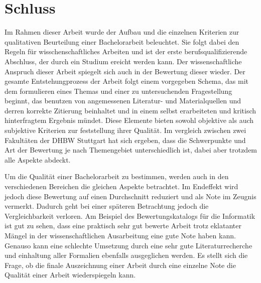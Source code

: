 
 
\chapter{Schluss}
Im Rahmen dieser Arbeit wurde der Aufbau und die einzelnen Kriterien zur qualitativen Beurteilung einer Bachelorarbeit beleuchtet. Sie folgt dabei den Regeln für wisschenschaftliches Arbeiten und ist der erste berufsqualifizierende Abschluss, der durch ein Studium ereicht werden kann.
Der wissenschaftliche Anspruch dieser Arbeit spiegelt sich auch in der Bewertung dieser wieder. Der gesamte Entstehungprozess der Arbeit folgt einem vorgegeben Schema, das mit dem formulieren eines Themas und einer zu untersuchenden Fragestellung beginnt, das benutzen von angemessenen Literatur- und Materialquellen und derren korrekte Zitierung beinhaltet und in einem selbst erarbeiteten und kritisch hinterfragtem Ergebnis mündet. Diese Elemente bieten sowohl objektive als auch subjektive Kriterien zur feststellung ihrer Qualität. Im vergleich zwischen zwei Fakultäten der \ac{DHBW} Stuttgart hat sich ergeben, dass die Schwerpunkte und Art der Bewertung je nach Themengebiet unterschiedlich ist, dabei aber trotzdem alle Aspekte abdeckt. 

Um die Qualität einer Bachelorarbeit zu bestimmen, werden auch in den verschiedenen Bereichen die gleichen Aspekte betrachtet. Im Endeffekt wird jedoch diese Bewertung auf einen Durchschnitt reduziert und als Note im Zeugnis vermerkt. Dadurch geht bei einer späteren Betrachtung jedoch die Vergleichbarkeit verloren. Am Beispiel des Bewertungskatalogs für die Informatik ist gut zu sehen, dass eine praktisch sehr gut bewerte Arbeit trotz eklatanter Mängel in der wissenschaftlichen Ausarbeitung eine gute Note haben kann. Genauso kann eine schlechte Umsetzung durch eine sehr gute Literaturrecherche und einhaltung aller Formalien ebenfalls ausgeglichen werden. Es stellt sich die Frage, ob die finale Auszeichnung einer Arbeit durch eine einzelne Note die Qualität einer Arbeit wiederspiegeln kann. 
 